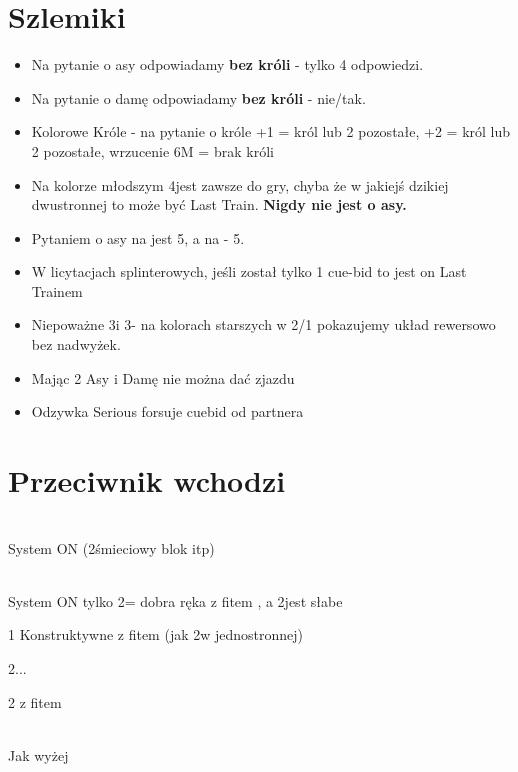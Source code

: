 \documentclass[12pt, a4paper]{article}
\begin{document}
\section*{Szlemiki}
\begin{itemize}
	\item Na pytanie o asy odpowiadamy \textbf{bez króli} - tylko 4 odpowiedzi.
	\item Na pytanie o damę odpowiadamy \textbf{bez króli} - nie/tak.
	\item Kolorowe Króle - na pytanie o króle +1 = król \clubs lub 2 pozostałe, +2 = król \diams lub 2 pozostałe, wrzucenie 6M = brak króli
	\br
	\item Na kolorze młodszym 4\nt jest zawsze do gry, chyba że w jakiejś dzikiej dwustronnej to może być Last Train. \textbf{Nigdy nie jest o asy.}
	\item Pytaniem o asy na \clubs jest 5\diams, a na \diams - 5\hearts.
	\item W licytacjach splinterowych, jeśli został tylko 1 cue-bid to jest on Last Trainem
	\br
	\item Niepoważne 3\spades i 3\nt - na kolorach starszych w 2/1 pokazujemy układ rewersowo bez nadwyżek.
	\item Mając 2 Asy i Damę nie można dać zjazdu
	\item Odzywka Serious forsuje cuebid od partnera
\end{itemize}






\section*{Przeciwnik wchodzi}

\compsequence{{1\clubs}{\dbl}} \\ System ON (2\nt śmieciowy blok itp)

\compsequence{{1\diams}{\dbl}} \\ System ON tylko 2\nt = dobra ręka z fitem \diams, a 2\diams jest słabe

\compsequence{{1\hearts}{\dbl}}
\begin{compoptions}[3]
	\item[1\nt] Konstruktywne z fitem (jak 2\hearts w jednostronnej) \imp
	\item[2\clubs...] \nf
	\item[2\nt] \invp z fitem \imp
\end{compoptions}

\compsequence{{1\spades}{\dbl}} \\ Jak wyżej
\end{document}
